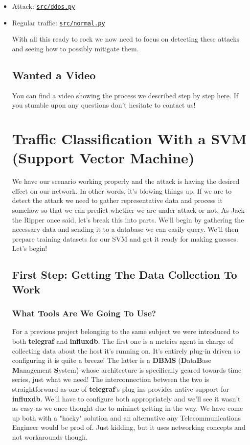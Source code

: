 \documentclass[12pt]{report}
\begin{document}
			\begin{itemize}
				\item Attack: \href{https://github.com/GAR-Project/project/blob/master/src/ddos.py}{\texttt{src/ddos.py}}
				\item Regular traffic: \href{https://github.com/GAR-Project/project/blob/master/src/normal.py}{\texttt{src/normal.py}}

			With all this ready to rock we now need to focus on detecting these attacks and seeing how to possibly mitigate them.

		\subsection{Wanted a Video}
			You can find a video showing the process we described step by step \href{https://www.youtube.com/watch?v=ofZPmV6_y_M}{here}. If you stumble upon any questions don't hesitate to contact us!

	\section{Traffic Classification With a SVM (\textbf{S}upport \textbf{V}ector \textbf{M}achine)}
		We have our scenario working properly and the attack is having the desired effect on our network. In other words, it's blowing things up. If we are to detect the attack we need to gather representative data and process it somehow so that we can predict whether we are under attack or not. As Jack the Ripper once said, let's break this into parts. We'll begin by gathering the necessary data and sending it to a database we can easily query. We'll then prepare training datasets for our SVM and get it ready for making guesses. Let's begin!

		\subsection{First Step: Getting The Data Collection To Work}
			\subsubsection{What Tools Are We Going To Use?}
				For a previous project belonging to the same subject we were introduced to both \textbf{telegraf} and \textbf{influxdb}. The first one is a metrics agent in charge of collecting data about the host it's running on. It's entirely plug-in driven so configuring it is quite a breeze! The latter is a \textbf{DBMS} (\textbf{D}ata\textbf{B}ase \textbf{M}anagement \textbf{S}ystem) whose architecture is specifically geared towards time series, just what we need! The interconnection between the two is straightforward as one of \textbf{telegraf}'s plug-ins provides native support for \textbf{influxdb}. We'll have to configure both appropriately and we'll see it wasn't as easy as we once thought due to mininet getting in the way. We have come up both with a "hacky" solution and an alternative any Telecommunications Engineer would be prod of. Just kidding, but it uses networking concepts and not workarounds though.


\end{itemize}
\end{document}
